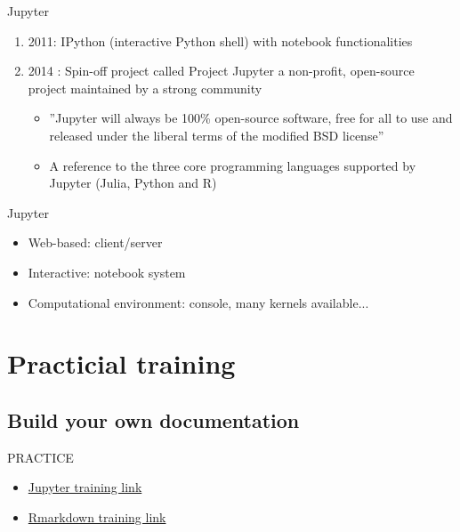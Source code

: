 \begin{frame}[<+->]{Jupyter}
\begin{enumerate}
	\item 2011:  IPython (interactive Python shell) with notebook functionalities
	\item 2014 : Spin-oﬀ project called Project Jupyter a non-proﬁt, open-source project maintained by a strong community
		\begin{itemize}
		\item ”Jupyter will always be 100\% open-source software, free for all to use and released under the liberal terms of the modiﬁed BSD license”
		\item A reference to the three core programming languages supported by Jupyter (Julia, Python and R)
		\end{itemize}
\end{enumerate}
\end{frame}

\begin{frame}{Jupyter}
\begin{itemize}
\item<2-4> Web-based: client/server
\item<3-4> Interactive: notebook system
\item<4-4> Computational environment: console, many kernels available...
\end{itemize}
\end{frame}

\section{Practicial training}
\subsection{Build your own documentation}
\begin{frame}
\begin{block}{PRACTICE}
\begin{itemize}
\item \href{https://github.com/mesocentre-clermont-auvergne/formation_fair_2022/tree/main/fair_documentation/TP_jupyter}{Jupyter training link} 
\item \href{https://github.com/mesocentre-clermont-auvergne/formation_fair_2022/blob/main/fair_documentation/rmarkdown_TP/}{Rmarkdown training link}
\end{itemize}
\end{block}
\end{frame}
